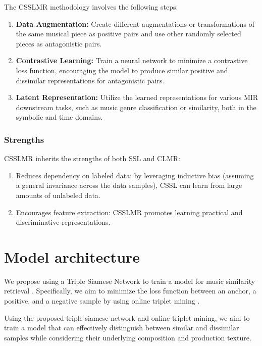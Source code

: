 The CSSLMR methodology involves the following steps:

\begin{enumerate}
\item \textbf{Data Augmentation:} Create different augmentations or transformations of the same musical piece as positive pairs and use other randomly selected pieces as antagonistic pairs.
\item \textbf{Contrastive Learning:} Train a neural network to minimize a contrastive loss function, encouraging the model to produce similar positive and dissimilar representations for antagonistic pairs.
\item\textbf{Latent Representation:} Utilize the learned representations for various MIR downstream tasks, such as music genre classification or similarity, both in the symbolic and time domains.
\end{enumerate} 

\subsubsection{Strengths}

CSSLMR inherits the strengths of both SSL and CLMR:

\begin{enumerate}
\item Reduces dependency on labeled data: by leveraging inductive bias (assuming a general invariance across the data samples), CSSL can learn from large amounts of unlabeled data.
\item Encourages feature extraction: CSSLMR promotes learning practical and discriminative representations.
\end{enumerate} 

\section{Model architecture}

We propose using a Triple Siamese Network to train a model for music similarity retrieval \cite{contentmusicsimtriplet2020}. Specifically, we aim to minimize the loss function between an anchor, a positive, and a negative sample by using online triplet mining \cite{Sikaroudi2020OfflinePatches}.

Using the proposed triple siamese network and online triplet mining, we aim to train a model that can effectively distinguish between similar and dissimilar samples while considering their underlying composition and production texture.



